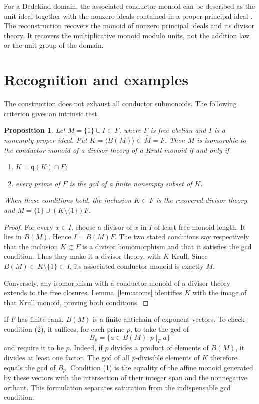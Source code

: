 \documentclass[11pt]{article}
\newtheorem{proposition}[theorem]{Proposition}
\theoremstyle{definition}
\newcommand{\q}{\mathsf q}
\begin{document}
For a Dedekind domain, the associated conductor monoid can be described as the unit ideal together with the nonzero ideals contained in a proper principal ideal \cite[Example 4.4]{GYZ}. The reconstruction recovers the monoid of nonzero principal ideals and its divisor theory. It recovers the multiplicative monoid modulo units, not the addition law or the unit group of the domain.

\section{Recognition and examples}

The construction does not exhaust all conductor submonoids. The following criterion gives an intrinsic test.

\begin{proposition}\label{prop:recognition}
Let $M=\{1\}\cup I\subset F$, where $F$ is free abelian and $I$ is a nonempty proper ideal. Put $K=\langle B(M)\rangle\subset\widehat M=F$. Then $M$ is isomorphic to the conductor monoid of a divisor theory of a Krull monoid if and only if
\begin{enumerate}
\item $K=\q(K)\cap F$;
\item every prime of $F$ is the gcd of a finite nonempty subset of $K$.
\end{enumerate}
When these conditions hold, the inclusion $K\subset F$ is the recovered divisor theory and $M=\{1\}\cup(K\setminus\{1\})F$.
\end{proposition}
\begin{proof}
For every $x\in I$, choose a divisor of $x$ in $I$ of least free-monoid length. It lies in $B(M)$. Hence $I=B(M)F$. The two stated conditions say respectively that the inclusion $K\subset F$ is a divisor homomorphism and that it satisfies the gcd condition. Thus they make it a divisor theory, with $K$ Krull. Since $B(M)\subset K\setminus\{1\}\subset I$, its associated conductor monoid is exactly $M$.

Conversely, any isomorphism with a conductor monoid of a divisor theory extends to the free closures. Lemma~\ref{lem:atoms} identifies $K$ with the image of that Krull monoid, proving both conditions.
\end{proof}

If $F$ has finite rank, $B(M)$ is a finite antichain of exponent vectors. To check condition (2), it suffices, for each prime $p$, to take the gcd of
\[
 B_p=\{a\in B(M):p\mid_F a\}
\]
and require it to be $p$. Indeed, if $p$ divides a product of elements of $B(M)$, it divides at least one factor. The gcd of all $p$-divisible elements of $K$ therefore equals the gcd of $B_p$. Condition (1) is the equality of the affine monoid generated by these vectors with the intersection of their integer span and the nonnegative orthant. This formulation separates saturation from the indispensable gcd condition.
\end{document}
